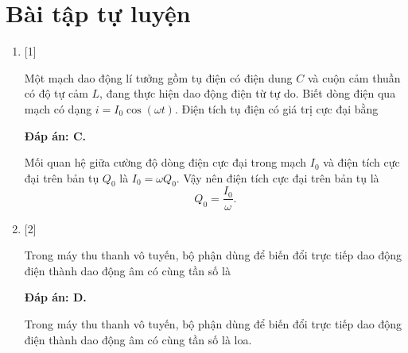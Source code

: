\section{Bài tập tự luyện}
\begin{enumerate}[label=\bfseries Câu \arabic*:]
	\item {} [1] %
	
	{Một mạch dao động lí tưởng gồm tụ điện có điện dung $C$ và cuộn cảm thuần có độ tự cảm $L$, đang thực hiện dao động điện từ tự do. Biết dòng điện qua mạch có dạng $i = I_0 \cos \left( \omega t \right)$. Điện tích tụ điện có giá trị cực đại bằng
	}
	
	\hideall
	{		\textbf{Đáp án: C.}
		
		Mối quan hệ giữa cường độ dòng điện cực đại trong mạch $I_0$ và điện tích cực đại trên bản tụ $Q_0$ là $I_0 = \omega Q_0$. Vậy nên điện tích cực đại trên bản tụ là 
		$$Q_0 = \dfrac{I_0}{\omega}.$$
		
	}
	
	\item {} [2] %
	{Trong máy thu thanh vô tuyến, bộ phận dùng để biến đổi trực tiếp dao động điện thành dao động âm có cùng tần số là
	}
	
	\hideall
	{		\textbf{Đáp án: D.}
		
		Trong máy thu thanh vô tuyến, bộ phận dùng để biến đổi trực tiếp dao động điện thành dao động âm có cùng tần số là loa.
		
	}
	

\end{enumerate}

